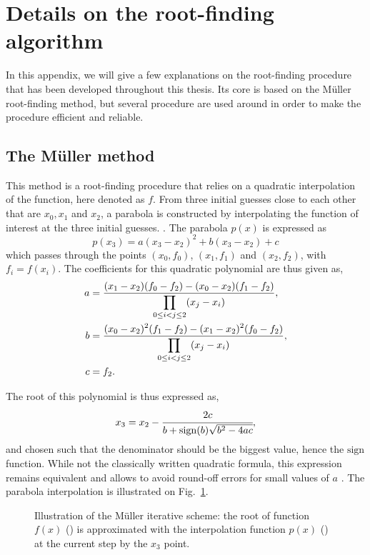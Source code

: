 \section{Details on the root-finding algorithm}
\label{sec:muller}
\setcounter{equation}{0}
In this appendix, we will give a few explanations on the root-finding procedure that has been developed throughout this thesis. Its core is based on the Müller root-finding method, but several procedure are used around in order to make the procedure efficient and reliable. 

\subsection{The Müller method}
This method is a root-finding procedure that relies on a quadratic interpolation of the function, here denoted as $f$. From three initial guesses close to each other that are $x_0, x_1$ and $x_2$, a parabola is constructed by interpolating the function of interest at the three initial guesses. \cite{muller1956,chapra2010}. The parabola $p(x)$ is expressed as
\begin{equation}
    p(x_3) = a (x_3-x_2)^2 + b(x_3-x_2) + c
\end{equation}
which passes through the points $(x_0, f_0)$, $(x_1, f_1)$ and $(x_2, f_2)$, with $f_i = f(x_i)$. The coefficients for this quadratic polynomial are thus given as,
\begin{equation}
    \begin{aligned}
        a &= \displaystyle\frac{\displaystyle (x_1 - x_2)(f_0 - f_2) - (x_0 - x_2)(f_1 - f_2)}{\displaystyle \prod_{0 \le i < j \le 2} (x_j - x_i)},\\
        b &= \displaystyle\frac{\displaystyle (x_0 - x_2)^2 (f_1 - f_2)-(x_1 - x_2)^2(f_0 - f_2)}{\displaystyle \prod_{0 \le i < j \le 2} (x_j - x_i)},\\
        c &= f_2.
    \end{aligned}
\end{equation}

The root of this polynomial is thus expressed as,
\begin{equation}
    x_3 = x_2 - \cfrac{2c}{b + \mathrm{sign}(b) \sqrt{b^2 - 4 a c}},
\end{equation}
and chosen such that the denominator should be the biggest value, hence the $ \mathrm{sign}$ function. While not the classically written quadratic formula, this expression remains equivalent and allows to avoid round-off errors for small values of $a$ \cite{press1992}. The parabola interpolation is illustrated on Fig.~\ref{fig:mulleriteration}.
\begin{figure}[htpb]
    \centering
    
    \caption{Illustration of the Müller iterative scheme: the root of function $f(x)$ (\soliddarkline) is approximated with the interpolation function $p(x)$ (\dasheddarkline) at the current step by the $x_3$ point.}
    \label{fig:mulleriteration}
\end{figure}

